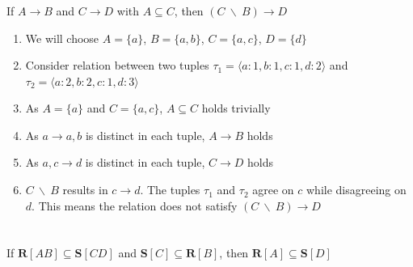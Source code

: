 \documentclass[letterpaper]{article}
\theoremstyle{plain}
\theoremstyle{definition}
\theoremstyle{remark}
\begin{document}
\subsubsection{}
\begin{center}
    If $A\rightarrow B$ and $C\rightarrow D$ with $A\subseteq C$, then $(C~\backslash~B)\rightarrow D$
\end{center}
\begin{enumerate}
    \item We will choose $A=\{a\}$, $B=\{a,b\}$, $C=\{a,c\}$, $D=\{d\}$
    \item Consider relation between two tuples $\tau_1=\langle a:1,b:1,c:1,d:2\rangle $ and $\tau_2=\langle a:2,b:2,c:1,d:3\rangle $
    \item As $A=\{a\}$ and $C=\{a,c\}$, $A\subseteq C$ holds trivially
    \item As $a\rightarrow a,b$ is distinct in each tuple, $A\rightarrow B$ holds
    \item As $a,c\rightarrow d$ is distinct in each tuple, $C\rightarrow D$ holds
    \item $C~\backslash~B$ results in $c\rightarrow d$. The tuples $\tau_1$ and $\tau_2$ agree on $c$ while disagreeing on $d$. This means the relation does not satisfy $(C~\backslash~B)\rightarrow D$
\end{enumerate}

\newpage

\section{}
\subsection{}
\subsubsection{}
\begin{center}
    If $\textbf{R}[AB]\subseteq \textbf{S}[CD]$ and $\textbf{S}[C]\subseteq\textbf{R}[B]$, then $\textbf{R}[A]\subseteq\textbf{S}[D]$
\end{center}
\end{document}
